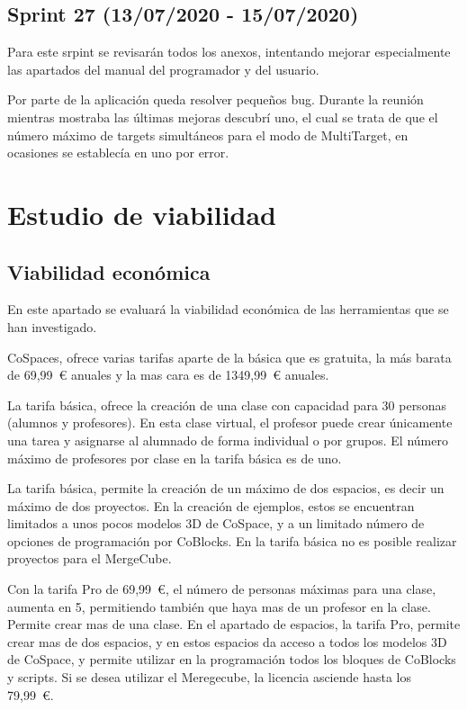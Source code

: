   \subsection{Sprint 27 (13/07/2020 - 15/07/2020)} 
 Para este srpint se revisarán todos los anexos, intentando mejorar especialmente las apartados del manual del programador y del usuario.
 
Por parte de la aplicación queda resolver pequeños bug. Durante la reunión mientras mostraba las últimas mejoras descubrí uno, el cual se trata de que el número máximo de targets simultáneos para el modo de MultiTarget, en ocasiones se establecía en uno por error.

\section{Estudio de viabilidad}

\subsection{Viabilidad económica}

En este apartado se evaluará la viabilidad económica de las herramientas que se han investigado.


CoSpaces, ofrece varias tarifas aparte de la básica que es gratuita, la más barata de 69,99~\euro{}  anuales y la mas cara es de 1349,99~\euro{} anuales.

La tarifa básica, ofrece la creación de una clase con capacidad para 30 personas (alumnos y profesores). En esta clase virtual, el profesor puede crear únicamente una tarea y asignarse al alumnado de forma individual o por grupos. El número máximo de profesores por clase en la tarifa básica es de uno.

La tarifa básica, permite la creación de un máximo de dos espacios, es decir un máximo de dos proyectos. En la creación de ejemplos, estos se encuentran limitados a unos pocos modelos 3D de CoSpace, y a un limitado número de opciones de programación por CoBlocks. En la tarifa básica no es posible realizar proyectos para el MergeCube.

Con la tarifa Pro de 69,99~\euro{}, el número de personas máximas para una clase, aumenta en 5, permitiendo también que haya mas de un profesor en la clase. Permite crear mas de una clase. En el apartado de espacios, la tarifa Pro, permite crear mas de dos espacios, y en estos espacios da acceso a todos los modelos 3D de CoSpace, y permite utilizar en la programación todos los bloques de CoBlocks y scripts.
Si se desea utilizar el Meregecube, la licencia asciende hasta los 79,99~\euro{}. 

